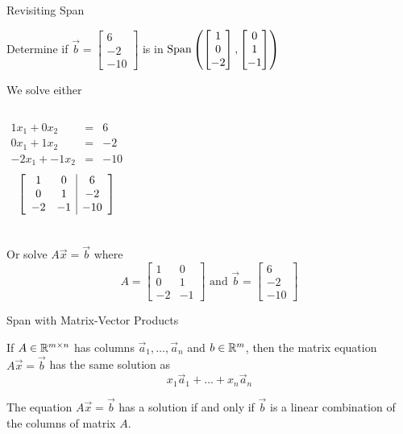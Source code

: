 \documentclass[xcoler=dvipsnames, aspectratio=169]{beamer}
\begin{document}
    \begin{frame}{Revisiting Span}
        \begin{example}
            \small
            Determine if $\vec{b}=\begin{bmatrix} 6\\-2\\-10\end{bmatrix}$ is in 
                $
                    \Span{\begin{bmatrix}1\\0\\-2\end{bmatrix},\begin{bmatrix}0\\1\\-1\end{bmatrix}}
                $
        \end{example}
        \pause
        We solve either
        \begin{columns}
            \begin{eqnarray*}
                1x_1 + 0x_2 &=& 6\\
                0x_1 + 1x_2 &=&-2\\
                -2x_1 + -1x_2 &=& -10
            \end{eqnarray*}
            \[
                \aMat{cc|c}{
                    1&0&6\\
                    0&1&-2\\
                    -2&-1&-10
                }
            \]
        \end{columns}
        \pause
        Or solve $A\vec{x} = \vec{b}$ where
        \[
            A = \begin{bmatrix}
                1&0\\0&1\\-2&-1
            \end{bmatrix}\text{ and }\vec{b} = \begin{bmatrix}
                6\\-2\\-10
            \end{bmatrix}
        \]
    \end{frame}
    \begin{frame}{Span with Matrix-Vector Products}
        \begin{tcolorbox}
            If $A\in\R^{m\times n}$ has columns $\vec{a}_1,\dots,\vec{a}_n$ and $b\in\R^m$, then
            the matrix equation $A\vec{x}=\vec{b}$ has the same solution as 
            \[
                x_1\vec{a}_1 + \dots + x_n\vec{a}_n
            \]
        \end{tcolorbox}
        \vspace{70pt}
        \begin{theorem}
            The equation $A\vec{x}=\vec{b}$ has a solution if and only if $\vec{b}$ is a linear 
            combination of the columns of matrix $A$.
        \end{theorem}
    \end{frame}
\end{document}
